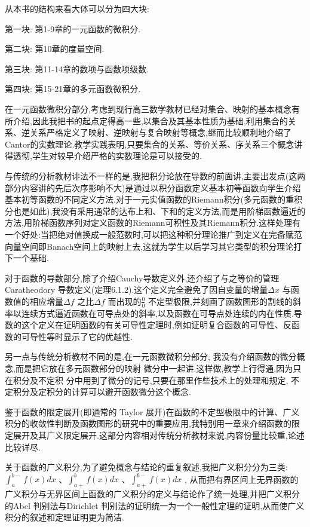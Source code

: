从本书的结构来看大体可以分为四大块:

第一块: 第1-9章的一元函数的微积分.

第二块: 第10章的度量空间.

第三块: 第11-14章的数项与函数项级数.

第四块: 第15-21章的多元函数微积分.

在一元函数微积分部分,考虑到现行高三数学教材已经对集合、映射的基本概念有所介绍,因此我把书的起点定得高一些,以集合及其基本性质为基础,利用集合的关系、逆关系严格定义了映射、逆映射与复合映射等概念,继而比较顺利地介绍了Cantor的实数理论.教学实践表明,只要集合的关系、等价关系、序关系三个概念讲得透彻,学生对较早介绍严格的实数理论是可以接受的.

与传统的分析教材诽法不一样的是,我把积分论放在导数的前面讲,主要出发点(这两部分内容讲的先后次序影响不大)是通过以积分函数定义基本初等函数向学生介绍基本初等函数的不同定义方法.对于一元实值函数的Riemann积分(多元函数的重积分也是如此),我没有采用通常的达布上和、下和的定义方法,而是用阶梯函数逼近的方法,用阶梯函数序列对定义函数的Riemann可积性及其Riemann积分.这样处理有一个好处:当把绝对值换成一般范数时,可以把这种积分理论推广到定义在完备赋范向量空间即Banach空间上的映射上去,这就为学生以后学习其它类型的积分理论打下一个基础.

对于函数的导数部分,除了介绍Cauchy导数定义外,还介绍了与之等价的管理Caratheodory 导数定义(定理6.1.2).这个定义完全避免了因自变量的增量\(\Delta x\) 与函数值的相应增量\(\Delta f\) 之比\(\Delta f\) 而出现的\(\frac{0}{0}\) 不定型极限,并刻画了函数图形的割线的斜率以连续方式逼近函数在可导点处的斜率,以及函数在可导点处连续的内在性质.导数的这个定义在证明函数的有关可导性定理时,例如证明复合函数的可导性、反函数的可导性等时显示了它的优越性.

另一点与传统分析教材不同的是,在一元函数微积分部分, 我没有介绍函数的微分概念,而是把它放在多元函数部分的映射 微分中一起讲.这样做,教学上行得通,因为只在积分及不定积 分中用到了微分的记号,只要在那里作些技术上的处理和规定, 不定积分及定积分的计算可以避开函数微分这个概念.

鉴于函数的限定展开(即通常的 Taylor 展开)在函数的不定型极限中的计算、广义积分的收敛性判断及函数图形的研究中的重要应用,我特别用一章来介绍函数的限定展开及其广义限定展开.这部分内容相对传统分析教材来说,内容份量比较重,论述比较详尽.

关于函数的广义积分,为了避免概念与结论的重复叙述,我把广义积分分为三类:\(\int_a^{b-} f(x)dx\) 、\(\int_{a+}^b f(x)dx\) 、\(\int_{a+}^{b-} f(x)dx\) , 从而把有界区间上无界函数的广义积分与无界区间上函数的广义积分的定义与结论作了统一处理,并把广义积分的Abel 判别法与Dirichlet 判别法的证明统一为一个一般性定理的证明,从而使广义积分的叙述和定理证明更为简洁.

